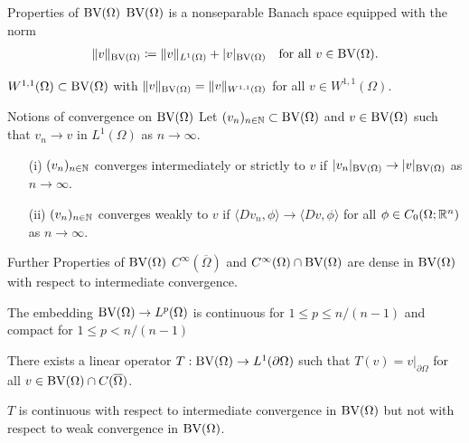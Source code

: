 \documentclass[xcolor=svgnames,english]{beamer}
\begin{document}
\begin{frame}{Properties of $\textup{BV}(\Omega)$}
  $\textup{BV}(\Omega)$ is a nonseparable Banach space equipped with the norm
  \begin{align*}
    \Vert v \Vert_{\textup{BV}(\Omega)} \coloneqq \Vert v\Vert_{L^1(\Omega)} +
    |v|_{\textup{BV}(\Omega)}\quad\text{for all } v\in\textup{BV}(\Omega).
  \end{align*}
  
  \pause
  \medskip
  $W^{1,1}(\Omega)\subset\textup{BV}(\Omega)$ with $\Vert v\Vert_{\textup{BV}(\Omega)}=
  \Vert v\Vert_{W^{1,1}(\Omega)}$ for all $v\in W^{1,1}(\Omega)$.
\end{frame}

\begin{frame}{Notions of convergence on $\textup{BV}(\Omega)$}
  Let $(v_n)_{n\in\mathbb{N}}\subset \textup{BV}(\Omega)$ and $v\in \textup{BV}(\Omega)$ such that
  $v_n\rightarrow v$ in $L^1(\Omega)$ as $n\rightarrow\infty$.
  \begin{itemize}
    \item[(i)]
      $(v_n)_{n\in\mathbb{N}}$ converges intermediately or strictly to $v$
      if $|v_n|_{\textup{BV}(\Omega)}\rightarrow |v|_{\textup{BV}(\Omega)}$ as
      $n\rightarrow\infty$.
      \pause
    \item[(ii)] $(v_n)_{n\in\mathbb{N}}$ converges weakly to
      $v$ if
      $\langle Dv_n,\phi\rangle\rightarrow \langle Dv,\phi\rangle$ 
      for all $\phi\in C_0(\Omega;\mathbb{R}^n)$ as 
      $n\rightarrow\infty$.
  \end{itemize}
\end{frame}

\begin{frame}{Further Properties of $\textup{BV}(\Omega)$}
  $C^\infty(\overline\Omega)$ and $C^\infty(\Omega)\cap\textup{BV}(\Omega)$ are dense
  in $\textup{BV}(\Omega)$ with respect to intermediate convergence.
  
  \pause
  \bigskip

  The embedding $\textup{BV}(\Omega)\to L^p(\Omega)$ is continuous for
  $1\leq p\leq n/(n-1)$ and compact for $1\leq p< n/(n-1)$
  
  \pause
  \bigskip

  There exists a linear operator $T:\textup{BV}(\Omega)\to L^1(\partial\Omega)$
  such that $T(v) = v|_{\partial\Omega}$ for all $v\in\textup{BV}(\Omega)\cap
  C(\overline\Omega)$.

  $T$ is continuous with respect to intermediate convergence in $\textup{BV}(\Omega)$
  but not with respect to weak convergence in $\textup{BV}(\Omega)$. 
\end{frame}
\end{document}
